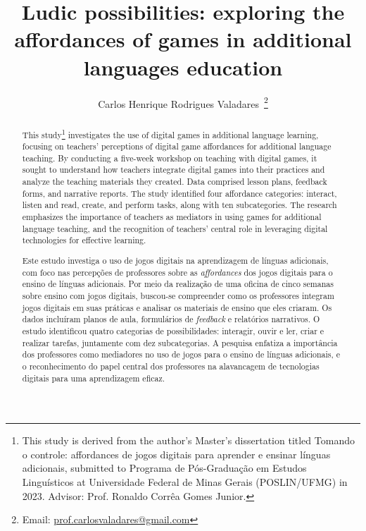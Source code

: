 \documentclass[english]{textolivre}
\title{Ludic possibilities: exploring the affordances of games in additional languages education}
\author[1]{Carlos Henrique Rodrigues Valadares~\orcid{0000-0002-8999-6216}\thanks{Email: \href{mailto:prof.carlosvaladares@gmail.com}{prof.carlosvaladares@gmail.com}}}
\affil[1]{Universidade Federal de Minas Gerais, Faculdade de Letras, Belo Horizonte, MG, Brasil.}
\begin{document}
\maketitle

\begin{polyabstract}
\begin{abstract}
This study\footnote{This study is derived from the author’s Master’s dissertation titled Tomando o controle: affordances de jogos digitais para aprender e ensinar línguas adicionais, submitted to Programa de Pós-Graduação em Estudos Linguísticos at Universidade Federal de Minas Gerais (POSLIN/UFMG) in 2023. Advisor: Prof. Ronaldo Corrêa Gomes Junior.} investigates the use of digital games in additional language learning, focusing on teachers’ perceptions of digital game affordances for additional language teaching. By conducting a five-week workshop on teaching with digital games, it sought to understand how teachers integrate digital games into their practices and analyze the teaching materials they created. Data comprised lesson plans, feedback forms, and narrative reports. The study identified four affordance categories: interact, listen and read, create, and perform tasks, along with ten subcategories. The research emphasizes the importance of teachers as mediators in using games for additional language teaching, and the recognition of teachers’ central role in leveraging digital technologies for effective learning.

\end{abstract}

\begin{portuguese}
\begin{abstract}
Este estudo investiga o uso de jogos digitais na aprendizagem de línguas adicionais, com foco nas percepções de professores sobre as \textit{affordances} dos jogos digitais para o ensino de línguas adicionais. Por meio da realização de uma oficina de cinco semanas sobre ensino com jogos digitais, buscou-se compreender como os professores integram jogos digitais em suas práticas e analisar os materiais de ensino que eles criaram. Os dados incluíram planos de aula, formulários de \textit{feedback} e relatórios narrativos. O estudo identificou quatro categorias de possibilidades: interagir, ouvir e ler, criar e realizar tarefas, juntamente com dez subcategorias. A pesquisa enfatiza a importância dos professores como mediadores no uso de jogos para o ensino de línguas adicionais, e o reconhecimento do papel central dos professores na alavancagem de tecnologias digitais para uma aprendizagem eficaz.

\end{abstract}
\end{portuguese}
\end{polyabstract}
\end{document}
